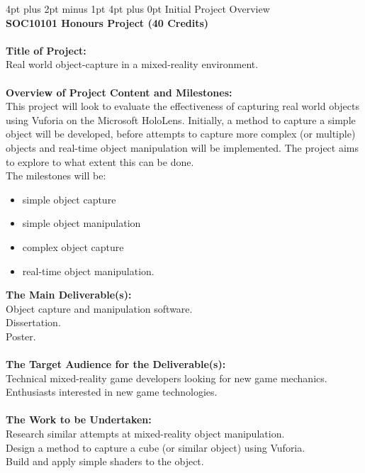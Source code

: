 \documentclass[12pt,a4paper]{article}
\makeatletter
\renewcommand\section{\@startsection {section}{1}{0mm} %
                               {4pt plus 2pt minus 1pt} %
                               {4pt plus 0pt} %
                               {\Large\bfseries}}
\makeatother
\begin{document}
\begin{appendices}
\section{Initial Project Overview}
 \ \\ \textbf{SOC10101 Honours Project (40 Credits)} \\ \\
\textbf{Title of Project:} \\
Real world object-capture in a mixed-reality environment. \\ \\
\textbf{Overview of Project Content and Milestones:} \\
This project will look to evaluate the effectiveness of capturing real world objects using Vuforia on the Microsoft HoloLens. Initially, a method to capture a simple object will be developed, before attempts to capture more complex (or multiple) objects and real-time object manipulation will be implemented. The project aims to explore to what extent this can be done. \\
The milestones will be: 
\begin{itemize}\itemsep0pt
	\item simple object capture
	\item simple object manipulation
	\item complex object capture
	\item real-time object manipulation.
\end{itemize}
\textbf{The Main Deliverable(s):} \\
Object capture and manipulation software. \\
Dissertation. \\
Poster. \\ \\
\textbf{The Target Audience for the Deliverable(s):} \\
Technical mixed-reality game developers looking for new game mechanics. \\
Enthusiasts interested in new game technologies. \\ \\
\textbf{The Work to be Undertaken:} \\
Research similar attempts at mixed-reality object manipulation. \\
Design a method to capture a cube (or similar object) using Vuforia. \\
Build and apply simple shaders to the object. \\

\end{appendices}
\end{document}

